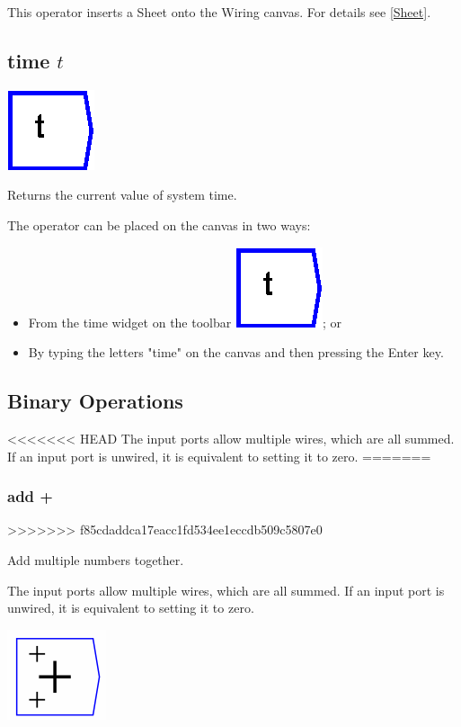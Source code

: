 This operator inserts a Sheet onto the Wiring canvas. For details
see \ref{Sheet}.

\subsection{time $t$}

\includegraphics{images/time}

\label{Operation:time} Returns the current value of system time.

The operator can be placed on the canvas in two ways:
\begin{itemize}
\item From the time widget on the toolbar \includegraphics{images/time};
or 
\item By typing the letters "time" on the canvas and then pressing the
Enter key.
\end{itemize}

\subsection{Binary Operations}

\label{Binary-Operations}

<<<<<<< HEAD
The input ports allow multiple wires, which are all summed. If an
input port is unwired, it is equivalent to setting it to zero.
=======
\subsubsection{add +}
>>>>>>> f85cdaddca17eacc1fd534ee1eccdb509c5807e0

\label{Operation:add} Add multiple numbers together.

The input ports allow multiple wires, which are all summed. If an
input port is unwired, it is equivalent to setting it to zero.

\includegraphics{images/PlusSymbol}

